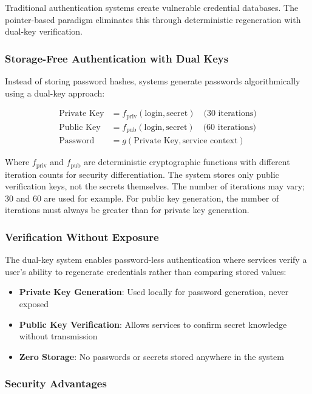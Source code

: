 \documentclass[11pt,a4paper]{article}
\begin{document}
Traditional authentication systems create vulnerable credential databases. The pointer-based paradigm eliminates this through deterministic regeneration with dual-key verification.

\subsubsection{Storage-Free Authentication with Dual Keys}

Instead of storing password hashes, systems generate passwords algorithmically using a dual-key approach:

\begin{align}
\text{Private Key} &= f_{\text{priv}}(\text{login}, \text{secret}) \quad \text{(30 iterations)} \\
\text{Public Key} &= f_{\text{pub}}(\text{login}, \text{secret}) \quad \text{(60 iterations)} \\
\text{Password} &= g(\text{Private Key}, \text{service context})
\end{align}

Where $f_{\text{priv}}$ and $f_{\text{pub}}$ are deterministic cryptographic functions with different iteration counts for security differentiation. The system stores only public verification keys, not the secrets themselves. The number of iterations may vary; 30 and 60 are used for example. For public key generation, the number of iterations must always be greater than for private key generation.

\subsubsection{Verification Without Exposure}

The dual-key system enables password-less authentication where services verify a user's ability to regenerate credentials rather than comparing stored values:

\begin{itemize}
    \item \textbf{Private Key Generation}: Used locally for password generation, never exposed
    \item \textbf{Public Key Verification}: Allows services to confirm secret knowledge without transmission
    \item \textbf{Zero Storage}: No passwords or secrets stored anywhere in the system
\end{itemize}

\subsubsection{Security Advantages}
\end{document}
